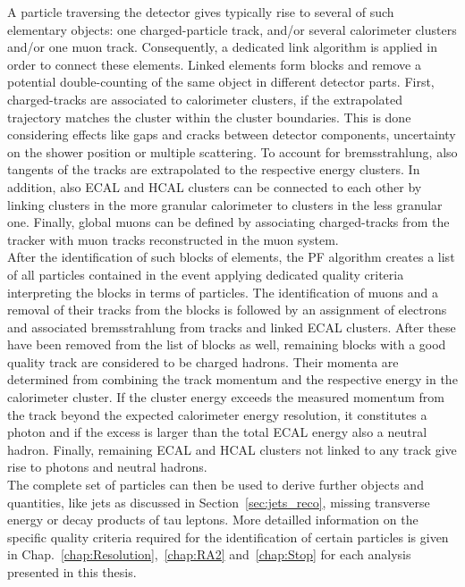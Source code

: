 A particle traversing the detector gives typically rise to several of such elementary objects: one charged-particle track, and/or several calorimeter clusters and/or one muon track. Consequently, a dedicated link algorithm is applied in order to connect these elements. Linked elements form blocks and remove a potential double-counting of the same object in different detector parts. First, charged-tracks are associated to calorimeter clusters, if the extrapolated trajectory matches the cluster within the cluster boundaries. This is done considering effects like gaps and cracks between detector components, uncertainty on the shower position or multiple scattering. To account for bremsstrahlung, also tangents of the tracks are extrapolated to the respective energy clusters. In addition, also ECAL and HCAL clusters can be connected to each other by linking clusters in the more granular calorimeter to clusters in the less granular one. Finally, global muons can be defined by associating charged-tracks from the tracker with muon tracks reconstructed in the muon system. \\
After the identification of such blocks of elements, the PF algorithm creates a list of all particles contained in the event applying dedicated quality criteria interpreting the blocks in terms of particles. The identification of muons and a removal of their tracks from the blocks is followed by an assignment of electrons and associated bremsstrahlung from tracks and linked ECAL clusters. After these have been removed from the list of blocks as well, remaining blocks with a good quality track are considered to be charged hadrons. Their momenta are determined from combining the track momentum and the respective energy in the calorimeter cluster. If the cluster energy exceeds the measured momentum from the track beyond the expected calorimeter energy resolution, it constitutes a photon and if the excess is larger than the total ECAL energy also a neutral hadron. Finally, remaining ECAL and HCAL clusters not linked to any track give rise to photons and neutral hadrons. \\
The complete set of particles can then be used to derive further objects and quantities, like jets as discussed in Section~\ref{sec:jets_reco}, missing transverse energy \met or decay products of tau leptons. More detailled information on the specific quality criteria required for the identification of certain particles is given in Chap.~\ref{chap:Resolution},~\ref{chap:RA2} and~\ref{chap:Stop} for each analysis presented in this thesis.

